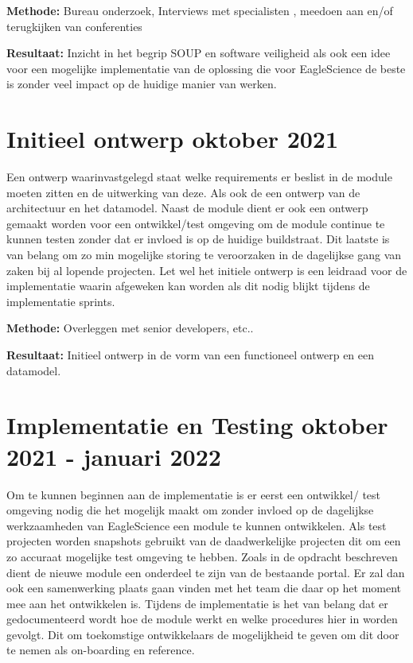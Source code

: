 \textbf{Methode:} Bureau onderzoek, Interviews met specialisten , meedoen aan en/of terugkijken van conferenties

\textbf{Resultaat:} Inzicht in het begrip SOUP en software veiligheid als ook een idee voor een mogelijke implementatie van de oplossing die voor EagleScience de beste is zonder veel impact op de huidige manier van werken.

\section{Initieel ontwerp \textbf{oktober 2021 }}\label{sec:initieel-ontwerp}
Een ontwerp waarinvastgelegd staat welke requirements er beslist in de module moeten zitten en de uitwerking van deze. Als ook de een ontwerp van de architectuur en het datamodel. Naast de module dient er ook een ontwerp gemaakt worden voor een ontwikkel/test omgeving om de module continue te kunnen testen zonder dat er invloed is op de huidige buildstraat. Dit laatste is van belang om zo min mogelijke storing te veroorzaken in de dagelijkse gang van zaken bij al lopende projecten. Let wel het initiele ontwerp is een leidraad voor de implementatie waarin afgeweken kan worden als dit nodig blijkt tijdens de implementatie sprints.

\textbf{Methode:} Overleggen met senior developers, etc..

\textbf{Resultaat:} Initieel ontwerp in de vorm van een functioneel ontwerp en een datamodel.

\section{Implementatie en Testing \textbf{oktober 2021 - januari 2022 }}\label{sec:implementatie-en-testing}
Om te kunnen beginnen aan de implementatie is er eerst een ontwikkel/ test omgeving nodig die het mogelijk maakt om zonder invloed op de dagelijkse werkzaamheden van EagleScience een module te kunnen ontwikkelen. Als test projecten worden snapshots gebruikt van de daadwerkelijke projecten dit om een zo accuraat mogelijke test omgeving te hebben. Zoals in de opdracht beschreven dient de nieuwe module een onderdeel te zijn van de bestaande portal. Er zal dan ook een samenwerking plaats gaan vinden met het team die daar op het moment mee aan het ontwikkelen is. Tijdens de implementatie is het van belang dat er gedocumenteerd wordt hoe de module werkt en welke procedures hier in worden gevolgt. Dit om toekomstige ontwikkelaars de mogelijkheid te geven om dit door te nemen als on-boarding en reference.

